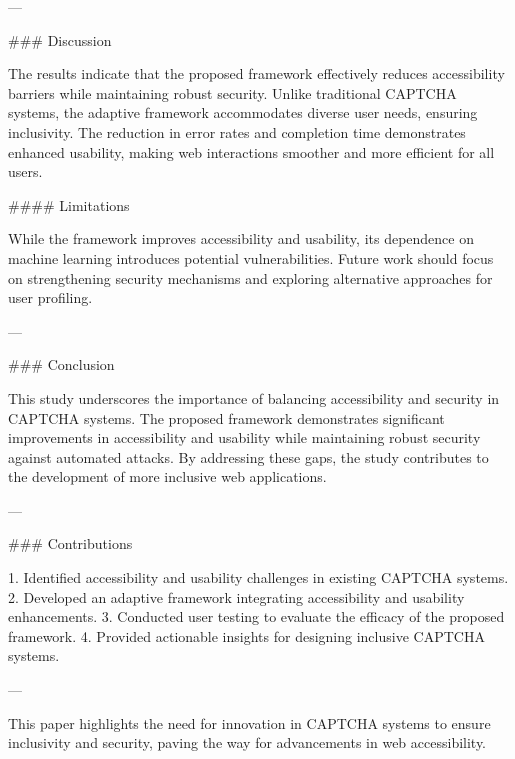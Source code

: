 ---

### Discussion

The results indicate that the proposed framework effectively reduces accessibility barriers while maintaining robust security. Unlike traditional CAPTCHA systems, the adaptive framework accommodates diverse user needs, ensuring inclusivity. The reduction in error rates and completion time demonstrates enhanced usability, making web interactions smoother and more efficient for all users.

#### Limitations

While the framework improves accessibility and usability, its dependence on machine learning introduces potential vulnerabilities. Future work should focus on strengthening security mechanisms and exploring alternative approaches for user profiling.

---

### Conclusion

This study underscores the importance of balancing accessibility and security in CAPTCHA systems. The proposed framework demonstrates significant improvements in accessibility and usability while maintaining robust security against automated attacks. By addressing these gaps, the study contributes to the development of more inclusive web applications.

---

### Contributions

1. Identified accessibility and usability challenges in existing CAPTCHA systems.
2. Developed an adaptive framework integrating accessibility and usability enhancements.
3. Conducted user testing to evaluate the efficacy of the proposed framework.
4. Provided actionable insights for designing inclusive CAPTCHA systems.

--- 

This paper highlights the need for innovation in CAPTCHA systems to ensure inclusivity and security, paving the way for advancements in web accessibility.